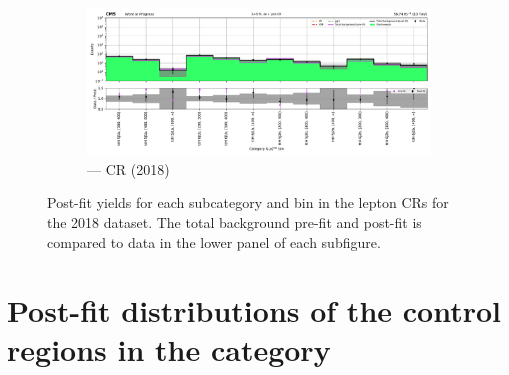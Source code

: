 \begin{figure}[htbp]
    \begin{subfigure}[b]{0.65\textwidth}
        \includegraphics[width=\textwidth]{chapters/higgstoinv/figures/mountain_ranges/2018/ttH/Zee_tree_fit_s-abs_values_ttH_cats.pdf}
        \caption{\ttH --- \doubleEleCr \gls{CR} (2018)}
    \end{subfigure}
    \caption[Post-fit yields for each \ttH subcategory and \ptmiss bin in the lepton control regions for the 2018 dataset]{Post-fit yields for each \ttH subcategory and \ptmiss bin in the lepton \glspl{CR} for the 2018 dataset. The total background pre-fit and post-fit is compared to data in the lower panel of each subfigure.}
    \label{fig:htoinv_mountain_range_ttH_2018_CRs}
\end{figure}

\clearpage




\section{Post-fit distributions of the control regions in the \texorpdfstring{\VH}{VH} category}
\label{sec:pre_post_fit_plots_VH_CRs}

